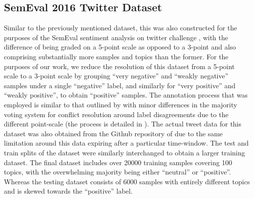 \documentclass[../../fyp.tex]{subfiles}
\begin{document}
\subsection{SemEval 2016 Twitter Dataset} \label{ds:nakov}
Similar to the previously mentioned dataset, this was also constructed for the purposes of the SemEval sentiment analysis on twitter challenge \citep{nakov2016}, with the difference of being graded on a 5-point scale as opposed to a 3-point and also comprising substantially more samples and topics than the former. For the purposes of our work, we reduce the resolution of this dataset from a 5-point scale to a 3-point scale by grouping \enquote{very negative} and \enquote{weakly negative} samples under a single \enquote{negative} label, and similarly for \enquote{very positive} and \enquote{weakly positive}, to obtain \enquote{positive} samples. The annotation process that was employed is similar to that outlined by \citet{rosenthal2015} with minor differences in the majority voting system for conflict resolution around label disagreements due to the different point-scale (the process is detailed in \citet{nakov2016}). The actual tweet data for this dataset was also obtained from the Github repository of \citet{baziotis2017} due to the same limitation around this data expiring after a particular time-window. The test and train splits of the dataset were similarly interchanged to obtain a larger training dataset. The final dataset includes over 20000 training samples covering 100 topics, with the overwhelming majority being either \enquote{neutral} or \enquote{positive}. Whereas the testing dataset consists of 6000 samples with entirely different topics and is skewed towards the \enquote{positive} label.
\end{document}
